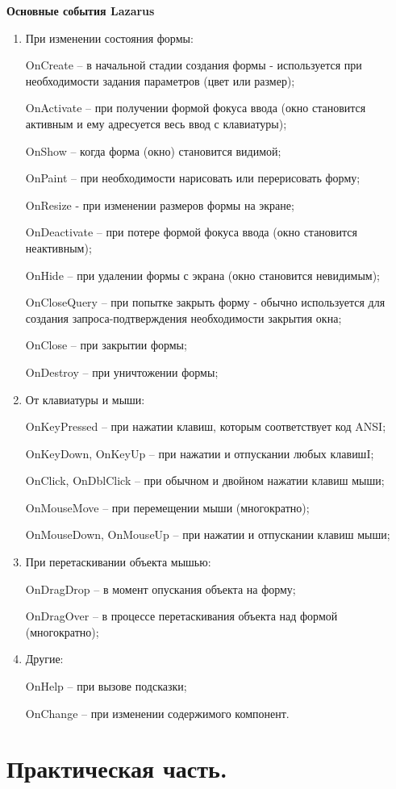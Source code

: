{\bf{Основные события Lazarus}}
\begin{enumerate}
\item При изменении состояния формы:

OnCreate – в начальной стадии создания формы - используется при необходимости задания параметров (цвет или размер);

OnActivate – при получении формой фокуса ввода (окно становится активным и ему адресуется весь ввод с клавиатуры);

OnShow – когда форма (окно) становится видимой;

OnPaint – при необходимости нарисовать или перерисовать форму;

OnResize - при изменении размеров формы на экране;

OnDeactivate – при потере формой фокуса ввода (окно становится неактивным);

OnHide – при удалении формы с экрана (окно становится невидимым); 

OnCloseQuery – при попытке закрыть форму - обычно используется для создания 
запроса-подтверждения необходимости закрытия окна;

OnClose – при закрытии формы;

OnDestroy – при уничтожении формы;
\item От клавиатуры и мыши:

OnKeyPressed – при нажатии клавиш, которым соответствует код ANSI;

OnKeyDown, OnKeyUp – при нажатии и отпускании любых клавишI;

OnClick, OnDblClick – при обычном и двойном нажатии клавиш мыши;

OnMouseMove – при перемещении мыши (многократно);

OnMouseDown, OnMouseUp – при нажатии и отпускании клавиш мыши;
\item При перетаскивании объекта мышью:

OnDragDrop – в момент опускания объекта на форму;

OnDragOver – в процессе перетаскивания объекта над формой (многократно);
\item Другие:

OnHelp – при вызове подсказки;

OnChange – при изменении содержимого компонент.
\end{enumerate}


\newpage\section{Практическая часть.}

